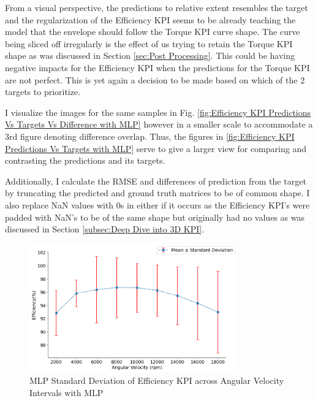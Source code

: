 \documentclass{report} %
\begin{document}
From a visual perspective, the predictions to relative extent resembles the target and the regularization of the Efficiency \ac{KPI} seems to be already teaching 
the model that the envelope should follow the Torque \ac{KPI} curve shape.  
The curve being sliced off irregularly is the effect of us trying to retain the Torque \ac{KPI} shape as was discussed in Section \ref{sec:Post Processing}.
This could be having negative impacts for the Efficiency \ac{KPI}  when the predictions for the Torque \ac{KPI} are not perfect.
This is yet again a decision to be made based on which of the 2 targets to prioritize. 

I visualize the images for the same samples in Fig. \ref{fig:Efficiency KPI Predictions Vs Targets Vs Difference with MLP} however in a smaller scale to accommodate 
a 3rd figure denoting difference overlap. Thus, the figures in \ref{fig:Efficiency KPI Predictions Vs Targets with MLP} serve to give a larger view for comparing and 
contrasting the predictions and its targets.

Additionally, I calculate the \ac{RMSE} and differences of prediction from the target by truncating the predicted and ground truth matrices to be of common shape.
I also replace \ac{NaN} values with 0s in either if it occurs as the Efficiency \ac{KPI}'s were padded with \ac{NaN}'s to be of the same shape but originally 
had no values as was discussed in Section \ref{subsec:Deep Dive into 3D KPI}.

\begin{figure}[H]
    \centering
    \includegraphics[width=0.8\textwidth]{./ReportImages/stddev_y2_nn_MLP.png} 
    \caption{\ac{MLP} Standard Deviation of Efficiency \ac{KPI} across Angular Velocity Intervals with \ac{MLP}} 
    \label{fig:MLP Standard Deviation of 3D KPI(Efficiency) across Angular Velocity Intervals with MLP}
\end{figure}
\end{document}
